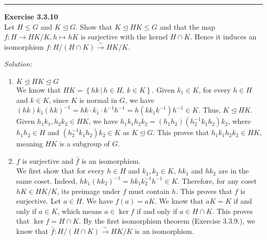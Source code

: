 \documentclass[a4paper, 12pt]{article}
\newenvironment{problem}[2][Exercise]
    { \begin{mdframed}[backgroundcolor=gray!20] \textbf{#1 #2} \\}
    {  \end{mdframed}}
\newenvironment{solution}
    {\textit{Solution:}}
    {}
\begin{document}
\noindent\rule{7in}{2.8pt}
\begin{problem}{3.3.10}
Let \(H\leq G\) and \(K\unlhd G\). Show that \(K\unlhd HK\leq G\) and that the map \(f:H\rightarrow HK/K,h\mapsto hK\) is surjective with the kernel \(H\cap K\). Hence it 
induces an isomorphism \(f:H/(H\cap K)\xrightarrow{\sim}HK/K\).
\end{problem}
\begin{solution}
\begin{enumerate}
\item \(K\unlhd HK\unlhd G\)\\ 
We know that \(HK=\left\{ hk\, |\, h\in H,\, k\in K\right\}\). Given \(k_1\in K\), for every \(h\in H\) and \(k\in K\), since \(K\) is normal in \(G\), we have \((hk)k_1(hk)^{-1}=hk\cdot k_1\cdot k^{-1}h^{-1}=h(kk_1k^{-1})h^{-1}\in K\). Thus, 
\(K\unlhd HK\). Given \(h_1k_1,h_2k_2\in HK\), we have \(h_1k_1h_2k_2=(h_1h_2)(h_2^{-1}k_1h_2)k_2\), where \(h_1h_2\in H\) and \((h_2^{-1}k_1h_2)k_2\in K\) as \(K\unlhd G\). This proves that \(h_1k_1h_2k_2\in HK\), meaning \(HK\) is a subgroup of \(G\). 
\item \(f\) is surjective and \(\bar{f}\) is an isomorphism.\\ 
We first show that for every \(h\in H\) and \(k_1,k_2\in K\), \(hk_1\) and \(hk_2\) are in the same coset. Indeed, \(hk_1(hk_2)^{-1}=hk_1k_2^{-1}h^{-1}\in K\). Therefore, for any coset \(hK\in HK/K\), its preimage under \(f\) must contain \(h\). This proves that 
\(f\) is surjective. Let \(a\in H\). We have \(f(a)=aK\). We know that \(aK=K\) if and only if \(a\in K\), which means \(a\in \ker f\) if and only if \(a\in H\cap K\). This proves that \(\ker f=H\cap K\). By the first isomorphism theorem (Exercise 3.3.9.), we know that 
\(\bar{f}:H/(H\cap K)\xrightarrow{\sim} HK/K\) is an isomorphism.
\end{enumerate}
\end{solution}
\end{document}
